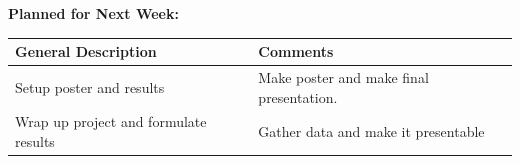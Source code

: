 \documentclass{article}
\begin{document}
\textbf{Planned for Next Week: }

\renewcommand{\arraystretch}{1.5}
\begin{table}[H]
    \centering
    \begin{tabularx}{0.95\textwidth} { 
        | >{\centering\arraybackslash}X
        | >{\centering\arraybackslash}X | }

    \hline
    \textbf{General Description} & \textbf{Comments} \\
    \hline
    Setup poster and results  & Make poster and make final presentation. \\
    \hline
    Wrap up project and formulate results & Gather data and make it presentable \\
    \hline
    \end{tabularx}
\end{table}
\end{document}
